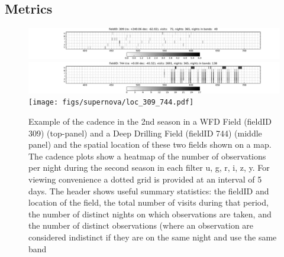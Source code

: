 
\subsection{Metrics}
\label{sec:\secname:metrics}


\begin{figure}
 \centering
 \includegraphics[width=\textwidth]{figs/supernova/fig_309_2ndYear}
 \includegraphics[width=\textwidth]{figs/supernova/fig_744_2ndYear}
 \texttt{[image: figs/supernova/loc\_309\_744.pdf]}
 \label{fig:SN_sampling}
 \caption{Example of the cadence in the 2nd season in a WFD Field
 (fieldID 309) (top-panel) and a Deep Drilling Field (fieldID 744)
 (middle panel) and the spatial location of these two fields shown on a
 map. The cadence plots show a heatmap of the number of observations per
 night during the second season in each filter u, g, r, i, z, y. For
 viewing convenience a dotted grid is provided at an interval of 5 days.
 The header shows useful summary statistics: the fieldID and location of
 the field, the total number of visits during that period, the number of
 distinct nights on which observations are taken, and the number of
 distinct observations (where an observation are considered indistinct
 if they are on the same night and use the same band}
\end{figure}


